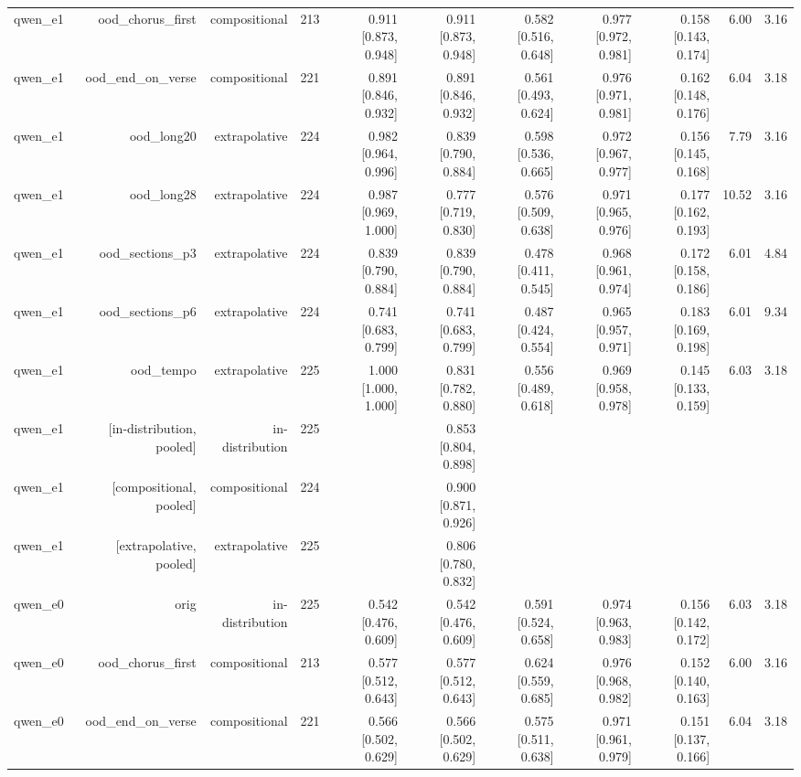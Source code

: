 \begin{table}[t]
\begin{tabular}{lrrrrrrrrrr}
qwen\_e1 & ood\_chorus\_first & compositional & 213 & 0.911 [0.873, 0.948] & 0.911 [0.873, 0.948] & 0.582 [0.516, 0.648] & 0.977 [0.972, 0.981] & 0.158 [0.143, 0.174] & 6.00 & 3.16 \\
qwen\_e1 & ood\_end\_on\_verse & compositional & 221 & 0.891 [0.846, 0.932] & 0.891 [0.846, 0.932] & 0.561 [0.493, 0.624] & 0.976 [0.971, 0.981] & 0.162 [0.148, 0.176] & 6.04 & 3.18 \\
qwen\_e1 & ood\_long20 & extrapolative & 224 & 0.982 [0.964, 0.996] & 0.839 [0.790, 0.884] & 0.598 [0.536, 0.665] & 0.972 [0.967, 0.977] & 0.156 [0.145, 0.168] & 7.79 & 3.16 \\
qwen\_e1 & ood\_long28 & extrapolative & 224 & 0.987 [0.969, 1.000] & 0.777 [0.719, 0.830] & 0.576 [0.509, 0.638] & 0.971 [0.965, 0.976] & 0.177 [0.162, 0.193] & 10.52 & 3.16 \\
qwen\_e1 & ood\_sections\_p3 & extrapolative & 224 & 0.839 [0.790, 0.884] & 0.839 [0.790, 0.884] & 0.478 [0.411, 0.545] & 0.968 [0.961, 0.974] & 0.172 [0.158, 0.186] & 6.01 & 4.84 \\
qwen\_e1 & ood\_sections\_p6 & extrapolative & 224 & 0.741 [0.683, 0.799] & 0.741 [0.683, 0.799] & 0.487 [0.424, 0.554] & 0.965 [0.957, 0.971] & 0.183 [0.169, 0.198] & 6.01 & 9.34 \\
qwen\_e1 & ood\_tempo & extrapolative & 225 & 1.000 [1.000, 1.000] & 0.831 [0.782, 0.880] & 0.556 [0.489, 0.618] & 0.969 [0.958, 0.978] & 0.145 [0.133, 0.159] & 6.03 & 3.18 \\
qwen\_e1 & [in-distribution, pooled] & in-distribution & 225 &  & 0.853 [0.804, 0.898] &  &  &  &  &  \\
qwen\_e1 & [compositional, pooled] & compositional & 224 &  & 0.900 [0.871, 0.926] &  &  &  &  &  \\
qwen\_e1 & [extrapolative, pooled] & extrapolative & 225 &  & 0.806 [0.780, 0.832] &  &  &  &  &  \\
qwen\_e0 & orig & in-distribution & 225 & 0.542 [0.476, 0.609] & 0.542 [0.476, 0.609] & 0.591 [0.524, 0.658] & 0.974 [0.963, 0.983] & 0.156 [0.142, 0.172] & 6.03 & 3.18 \\
qwen\_e0 & ood\_chorus\_first & compositional & 213 & 0.577 [0.512, 0.643] & 0.577 [0.512, 0.643] & 0.624 [0.559, 0.685] & 0.976 [0.968, 0.982] & 0.152 [0.140, 0.163] & 6.00 & 3.16 \\
qwen\_e0 & ood\_end\_on\_verse & compositional & 221 & 0.566 [0.502, 0.629] & 0.566 [0.502, 0.629] & 0.575 [0.511, 0.638] & 0.971 [0.961, 0.979] & 0.151 [0.137, 0.166] & 6.04 & 3.18 \\

\end{tabular}
\end{table}
